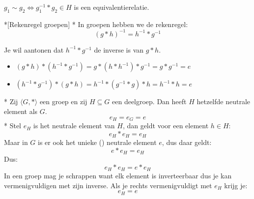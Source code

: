 \textbf{} $g_1 \sim g_2 \iff g_1^{-1} * g_2 \in H$ is een equivalentierelatie.

\begin{nicenote}*[Rekenregel groepen]\label{note:H3_rr_groepen}
    \nextpart[]*
    In groepen hebben we de rekenregel:
    \begin{equation*}
        (g * h)^{-1} = h^{-1} * g^{-1}
    \end{equation*}
\end{nicenote}

 Je wil aantonen dat $h^{-1} * g^{-1}$ de inverse is van $g*h$.
\begin{itemize}
    \item $(g*h)*(h^{-1}*g^{-1}) = g * (h * h^{-1}) * g^{-1} = g*g^{-1} = e$
    \item $(h^{-1} * g^{-1}) * (g*h) = h^{-1} * (g^{-1} * g) * h = h^{-1} * h = e$
\end{itemize}

\begin{niceproperty}*\label{H3_eG_is_eH}
    Zij $\langle G,* \rangle$ een groep en zij $H \subseteq G$ een deelgroep. Dan heeft $H$ hetzelfde neutrale element als $G$.
    \begin{equation*}
        e_H = e_G = e
    \end{equation*}
    \nextpart[Bewijs.]*
    Stel $e_H$ is het neutrale element van $H$, dan geldt voor een element $h \in H$:
    \begin{equation*}
        e_H * e_H = e_H
    \end{equation*}
    Maar in $G$ is er ook het unieke () neutrale element $e$, dus daar geldt:
    \begin{equation*}
        e * e_H = e_H
    \end{equation*}
    Dus:
    \begin{equation*}
        e_H * e_H = e * e_H
    \end{equation*}
    In een groep mag je schrappen want elk element is inverteerbaar dus je kan vermenigvuldigen met zijn inverse. Als je rechts vermenigvuldigt met $e_H$ krijg je:
    \begin{equation*}
        e_H = e
    \end{equation*}
\end{niceproperty}


